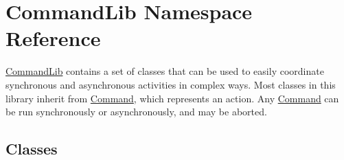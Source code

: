 \hypertarget{namespace_command_lib}{}\section{Command\+Lib Namespace Reference}
\label{namespace_command_lib}


\mbox{\hyperlink{namespace_command_lib}{Command\+Lib}} contains a set of classes that can be used to easily coordinate synchronous and asynchronous activities in complex ways. Most classes in this library inherit from \mbox{\hyperlink{class_command_lib_1_1_command}{Command}}, which represents an action. Any \mbox{\hyperlink{class_command_lib_1_1_command}{Command}} can be run synchronously or asynchronously, and may be aborted.  


\subsection*{Classes}
